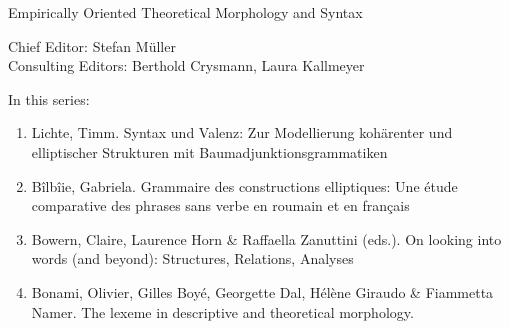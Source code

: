 {\large Em­pir­i­cal­ly Ori­ent­ed The­o­ret­i­cal Mor­phol­o­gy and Syn­tax}

\bigskip

Chief Editor: Stefan Müller \\
Consulting Editors: Berthold Crysmann, Laura Kallmeyer

\bigskip

In this series:

\begin{enumerate}
\item Lichte, Timm. Syntax und Valenz: Zur Modellierung kohärenter und elliptischer Strukturen mit Baumadjunktionsgrammatiken 
\item Bîlbîie, Gabriela. Grammaire des constructions elliptiques: Une étude comparative des phrases sans verbe en roumain et en français 
\item Bowern, Claire, Laurence Horn \& Raffaella Zanuttini (eds.). On looking into words (and beyond): Structures, Relations, Analyses
\item Bonami, Olivier, Gilles Boyé, Georgette Dal, Hélène Giraudo \& Fiammetta Namer. The lexeme in descriptive and theoretical morphology.

\end{enumerate}
